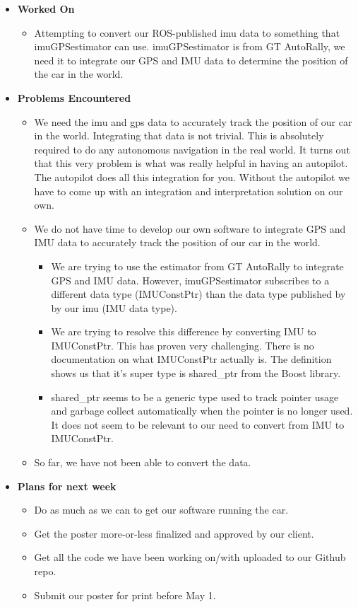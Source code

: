 \documentclass{article}
\begin{document}
\begin{itemize}
    \item {\textbf{Worked On}}
    \begin{itemize}
        \item Attempting to convert our ROS-published imu data to something that imuGPSestimator can use. imuGPSestimator is from GT AutoRally, we need it to integrate our GPS and IMU data to determine the position of the car in the world.
    \end{itemize}

    \item {\textbf{Problems Encountered}}
    \begin{itemize}
        \item We need the imu and gps data to accurately track the position of our car in the world. Integrating that data is not trivial. This is absolutely required to do any autonomous navigation in the real world. It turns out that this very problem is what was really helpful in having an autopilot. The autopilot does all this integration for you. Without the autopilot we have to come up with an integration and interpretation solution on our own.
\item We do not have time to develop our own software to integrate GPS and IMU data to accurately track the position of our car in the world.
    \begin{itemize}
        \item We are trying to use the estimator from GT AutoRally to integrate GPS and IMU data. However, imuGPSestimator subscribes to a different data type (IMUConstPtr) than the data type published by by our imu (IMU data type).
        \item We are trying to resolve this difference by converting IMU to IMUConstPtr. This has proven very challenging. There is no documentation on what IMUConstPtr actually is. The definition shows us that it's super type is shared\_ptr from the Boost library.
        \item shared\_ptr seems to be a generic type used to track pointer usage and garbage collect automatically when the pointer is no longer used. It does not seem to be relevant to our need to convert from IMU to IMUConstPtr.
    \end{itemize}

    \item So far, we have not been able to convert the data.
    \end{itemize}

    \item{\textbf{Plans for next week}}
    \begin{itemize}
        \item Do as much as we can to get our software running the car.
        \item Get the poster more-or-less finalized and approved by our client.
        \item Get all the code we have been working on/with uploaded to our Github repo.
        \item Submit our poster for print before May 1.
    \end{itemize}
\end{itemize}
\end{document}
